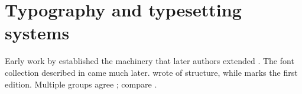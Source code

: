 \documentclass[11pt]{article}
\begin{document}
\section*{Typography and typesetting systems}
Early work by \citet{knuth84} established the machinery that later authors
extended \citep{lamport94,beeton07}. The font collection described in
\citep[see][p.~7]{gyre12} came much later. \citeauthor{lamport94} wrote of structure,
while \citeyear{knuth84} marks the first edition. Multiple groups agree
\citep{knuth84,lamport94}; compare \citealp{gyre12}.

\nocite{*}

\end{document}
